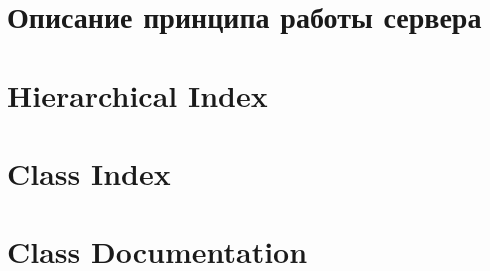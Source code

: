 \documentclass[twoside]{book}
\newcommand{\+}{\discretionary{\mbox{\scriptsize$\hookleftarrow$}}{}{}}
\newcommand{\clearemptydoublepage}{%
  \newpage{\pagestyle{empty}\cleardoublepage}%
}
\begin{document}
\chapter{Описание принципа работы сервера}
\label{md__home_antonov_work_project_pr_s63_brute_force_server_pr_s63_brute_force_server__readme}

\chapter{Hierarchical Index}

\chapter{Class Index}

\chapter{Class Documentation}


















\backmatter
\newpage
{}
\clearemptydoublepage
{}
\printindex
\end{document}
